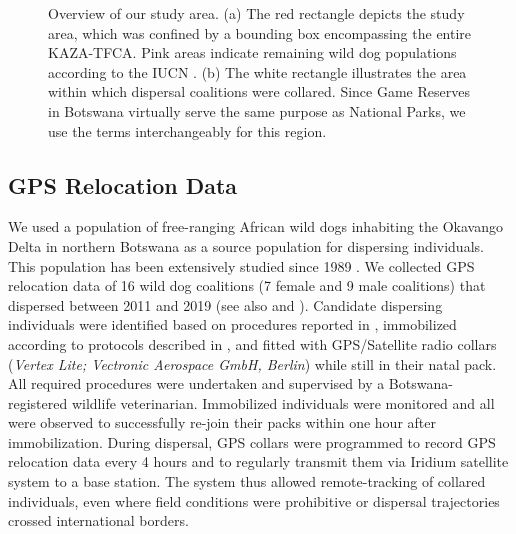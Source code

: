 \documentclass[abstract=on,10pt,a4paper,bibliography=totocnumbered]{article}
\begin{document}
\begin{figure}[h]
  \begin{center}
    \caption{Overview of our study area. (a) The red rectangle depicts the study
    area, which was confined by a bounding box encompassing the entire
    KAZA-TFCA. Pink areas indicate remaining wild dog populations according to
    the IUCN \citep{Woodroffe.2012}. (b) The white rectangle illustrates the
    area within which dispersal coalitions were collared. Since Game Reserves in
    Botswana virtually serve the same purpose as National Parks, we use the
    terms interchangeably for this region.}
    \label{StudyArea}
  \end{center}
\end{figure}


\subsection{GPS Relocation Data}
We used a population of free-ranging African wild dogs inhabiting the Okavango
Delta in northern Botswana as a source population for dispersing individuals.
This population has been extensively studied since 1989 \citep{McNutt.1996,
McNutt.2008, Cozzi.2013, Cozzi.2020, Behr.2020}. We collected GPS relocation
data of 16 wild dog coalitions (7 female and 9 male coalitions) that dispersed
between 2011 and 2019 (see also \citealp{Abrahms.2017} and
\citealp{Cozzi.2020}). Candidate dispersing individuals were identified based on
procedures reported in \cite{Behr.2020}, immobilized according to protocols
described in \cite{Osofsky.1996}, and fitted with GPS/Satellite radio collars
(\textit{Vertex Lite; Vectronic Aerospace GmbH, Berlin}) while still in their
natal pack. All required procedures were undertaken and supervised by a
Botswana-registered wildlife veterinarian. Immobilized individuals were
monitored and all were observed to successfully re-join their packs within one
hour after immobilization. During dispersal, GPS collars were programmed to
record GPS relocation data every 4 hours and to regularly transmit them via
Iridium satellite system to a base station. The system thus allowed
remote-tracking of collared individuals, even where field conditions were
prohibitive or dispersal trajectories crossed international borders.
\end{document}
